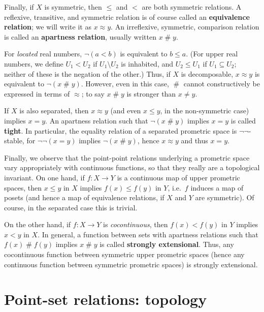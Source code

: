 \documentclass{article}
\def\apart{\mathrel{\#}}
\begin{document}
Finally, if $X$ is symmetric, then $\le$ and $<$ are both symmetric relations.
A reflexive, transitive, and symmetric relation is of course called an \textbf{equivalence relation}; we will write it as $x\approx y$.
An irreflexive, symmetric, comparison relation is called an \textbf{apartness relation}, usually written $x\apart y$.

For \emph{located} real numbers, $\neg(a<b)$ is equivalent to $b\le a$.
(For upper real numbers, we define $U_1 < U_2$ if $U_1\setminus U_2$ is inhabited, and $U_2\le U_1$ if $U_1 \subseteq U_2$; neither of these is the negation of the other.)
Thus, if $X$ is decomposable, $x\approx y$ is equivalent to $\neg(x\apart y)$.
However, even in this case, $\apart$ cannot constructively be expressed in terms of $\approx$; to say $x\apart y$ is stronger than $x\neq y$.

If $X$ is also separated, then $x\approx y$ (and even $x\le y$, in the non-symmetric case) implies $x=y$.
An apartness relation such that $\neg(x\apart y)$ implies $x=y$ is called \textbf{tight}.
In particular, the equality relation of a separated prometric space is $\neg\neg$-stable, for $\neg\neg(x=y)$ implies $\neg(x\apart y)$, hence $x\approx y$ and thus $x=y$.

Finally, we observe that the point-point relations underlying a prometric space vary appropriately with continuous functions, so that they really are a topological invariant.
On one hand, if $f:X\to Y$ is a continuous map of upper prometric spaces, then $x\le y$ in $X$ implies $f(x)\le f(y)$ in $Y$, i.e.\ $f$ induces a map of posets (and hence a map of equivalence relations, if $X$ and $Y$ are symmetric).
Of course, in the separated case this is trivial.

On the other hand, if $f:X\to Y$ is \emph{cocontinuous}, then $f(x)<f(y)$ in $Y$ implies $x<y$ in $X$.
In general, a function between sets with apartness relations such that $f(x)\apart f(y)$ implies $x\apart y$ is called \textbf{strongly extensional}.
Thus, any cocontinuous function between symmetric upper prometric spaces (hence any continuous function between symmetric prometric spaces) is strongly extensional.


\section{Point-set relations: topology}
\label{sec:point-set}
\label{sec:topology}
\end{document}
